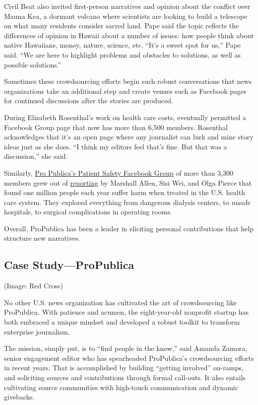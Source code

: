 \begin{itemize}
\begin{itemize}
\begin{enumerate}
{Civil Beat also invited first-person narratives and opinion about the conflict over Mauna Kea, a dormant volcano where scientists are looking to build a telescope on what many residents consider sacred land. Pape said the topic reflects the differences of opinion in Hawaii about a number of issues: how people think about native Hawaiians, money, nature, science, etc. “It’s a sweet spot for us,” Pape said. ``We are here to highlight problems and obstacles to solutions, as well as possible solutions.''\autocite{Pape}

Sometimes these crowdsourcing efforts begin such robust conversations that news organizations take an additional step and create venues such as Facebook pages for continued discussions after the stories are produced.

During Elizabeth Rosenthal’s work on health care costs,  eventually permitted a Facebook Group page that now has more than 6,500 members. Rosenthal acknowledges that it’s an open page where any journalist can lurk and mine story ideas just as she does. ``I think my editors feel that’s fine. But that was a discussion,'' she said.\autocite{Rosenthal}

Similarly, \href{https://www.facebook.com/groups/patientharm}{Pro Publica’s Patient Safety Facebook Group} of more than 3,300 members\autocite{Group} grew out of \href{https://www.propublica.org/series/patient-safety}{reporting} by Marshall Allen, Sisi Wei, and Olga Pierce that found one million people each year suffer harm when treated in the U.S. health care system.\autocite{Safety} They explored everything from dangerous dialysis centers, to unsafe hospitals, to surgical complications in operating rooms. 

Overall, ProPublica has been a leader in eliciting personal contributions that help structure new narratives.

\subsection{Case Study---ProPublica} (Image: Red Cross)
 
No other U.S. news organization has cultivated the art of crowdsourcing like ProPublica. With patience and acumen, the eight-year-old nonprofit startup has both embraced a unique mindset and developed a robust toolkit to transform enterprise journalism.

The mission, simply put, is to ``find people in the know,'' said Amanda Zamora, senior engagement editor who has spearheaded ProPublica’s crowdsourcing efforts in recent years. That is accomplished by building ``getting involved'' on-ramps, and soliciting sources and contributions through formal call-outs. It also entails cultivating source communities with high-touch communication and dynamic givebacks.

}
\end{enumerate}
\end{itemize}
\end{itemize}
